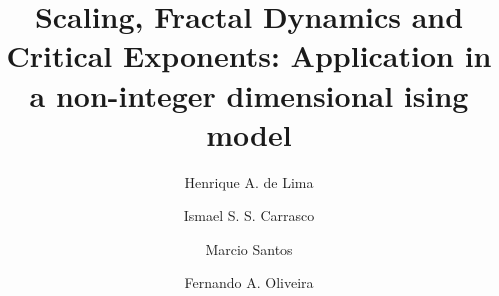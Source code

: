 \documentclass[pre,aps,twocolumn,showpacs,floatfix,nofootinbib,superscriptaddress,linenumbers]{revtex4-1}
\begin{document}
\title{ Scaling, Fractal Dynamics and Critical Exponents: Application in a non-integer dimensional ising model}
\author{Henrique A. de Lima}
\address{International Center of Physics, Institute of Physics, University of Brasilia, 70910-900, Brasilia, Federal District, Brazil}
\author{Ismael S. S. Carrasco}
\address{International Center of Physics, Institute of Physics, University of Brasilia, 70910-900, Brasilia, Federal District, Brazil}
\author{Marcio Santos}
\address{International Center of Physics, Institute of Physics, University of Brasilia, 70910-900, Brasilia, Federal District, Brazil}
\address{Instituto de F\'{\i}sica, Universidade Federal de Santa Catarina, Florian\'{o}polis, SC, Brazil}
\author{Fernando A. Oliveira}
\address{International Center of Physics, Institute of Physics, University of Brasilia, 70910-900, Brasilia, Federal District, Brazil}
\end{document}
